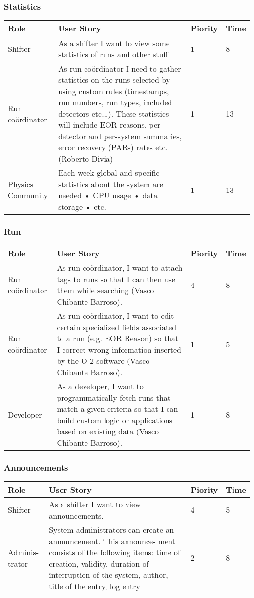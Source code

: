 \subsubsection{Statistics}
\begin{longtable}{ | p{2cm} | p{8cm} | p{1.5cm} | l |}
\hline
Role & User Story & Piority & Time \\ \hline
Shifter &  As a shifter I want to view some statistics of runs and other stuff. & 1 & 8 \\ \hline
Run coördinator &  As run coördinator I need to gather statistics on the runs selected by using custom rules (timestamps, run numbers, run types, included detectors etc...). These statistics will include EOR reasons, per-detector and per-system summaries, error recovery (PARs) rates etc.(Roberto Divia) & 1 & 13 \\ \hline
Physics Community &  Each week global and specific statistics about the system are needed
• CPU usage
• data storage
• etc. & 1 & 13 \\ \hline


\end{longtable}

\subsubsection{Run}
\begin{longtable}{ | p{2cm} | p{8cm} | p{1.5cm} | l |}
\hline
Role & User Story & Piority & Time \\ \hline
Run coördinator &  As run coördinator, I want to attach tags to runs so that I can then use them while searching (Vasco Chibante Barroso). & 4 & 8 \\ \hline
Run coördinator &  As run coördinator, I want to edit certain specialized fields associated to a run (e.g. EOR Reason) so that I correct wrong information inserted by the O 2 software (Vasco Chibante Barroso). & 1 & 5 \\ \hline
Developer &  As a developer, I want to programmatically fetch runs that match a
given criteria so that I can build custom logic or applications based on
existing data (Vasco Chibante Barroso). & 1 & 8 \\ \hline
\end{longtable}
\newpage
\subsubsection{Announcements}
\begin{longtable}{ | p{2cm} | p{8cm} | p{1.5cm} | l |}
\hline
Role & User Story & Piority & Time \\ \hline
Shifter &  As a shifter I want to view announcements. & 4 & 5 \\ \hline
Adminis-trator & System administrators can create an announcement. This announce-
ment consists of the following items: time of creation, validity, duration of interruption of the system, author, title of the entry, log entry & 2 & 8 \\ \hline
\end{longtable}

